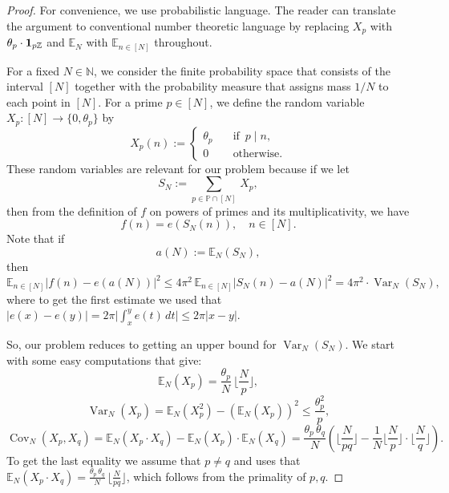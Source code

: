 \documentclass[10pt,a4paper]{amsart}
\newcommand{\Cov}{\operatorname{Cov}}
\newcommand{\E}{{\mathbb E}}
\newcommand{\N}{{\mathbb N}}
\newcommand{\Var}{\operatorname{Var}}
\newcommand{\Z}{{\mathbb Z}}
\renewcommand{\P}{{\mathbb P}}
\begin{document}
\begin{proof}
For convenience, we use probabilistic language. The reader can translate the argument to conventional number theoretic language by replacing $X_p$ with $\theta_p\cdot {\bf 1}_{p\Z}$
and $\E_N$ with $\E_{n\in[N]}$ throughout.


	For a fixed $N\in \N$, we  consider the finite probability space that consists of the  interval $[N]$ together with the probability measure that  assigns mass $1/N$ to each point in $[N]$. For a prime $p\in [N]$, we define the random variable
	$ X_p\colon [N]\to \{0,\theta_p\}$ by
	$$
	X_p(n):=
	\begin{cases} \theta_p \quad & \text {if } \, p\mid n, \\
		0 & \text{otherwise}.
	\end{cases}
	$$
	These random variables are relevant for our problem because if  we let
	$$
	S_N:=\sum_{p\in \P\cap [N]}\, X_p,
	$$
	then from the definition of $f$ on powers of primes and its multiplicativity, we have
	$$
	f(n)=e(S_N(n)), \quad n\in [N].
	$$
	Note that if
	$$
	a(N):=\E_N(S_N),
	$$
	then
	\begin{equation}\label{E:Var1}
		\E_{n\in [N]}|f(n)-e(a(N))|^2\leq 4\pi^2\,  \E_{n\in [N]}|S_N(n)-a(N)|^2=4 \pi^2\cdot \Var_N(S_N),
	\end{equation}
	where to get the first estimate we used that $|e(x)-e(y)|=2\pi \big|\int_x^y e(t)\, dt\big|\leq 2\pi|x-y|$.
	
	So, our problem reduces to getting an upper  bound  for   $ \Var_N(S_N)$.
	We start with some   easy computations that give:
\begin{equation}\label{srednia}
	\E_N(X_p)= \frac{\theta_p}{N}\, \Big\lfloor\frac{N}{p}\Big\rfloor,
\end{equation}
	$$
	\Var_N(X_p)= \E_N(X_p^2)-(\E_N(X_p))^2\leq \frac{\theta_p^2}{p},
	$$
	$$
	\Cov_N(X_p,X_q)=\E_N(X_p\cdot X_q)-\E_N(X_p)\cdot \E_N(X_q) = \frac{\theta_p\, \theta_q}{N}\left(\Big\lfloor\frac{N}{pq}\Big\rfloor - \frac{1}{N}\Big\lfloor\frac{N}{p}\Big\rfloor \cdot \Big\lfloor\frac{N}{q}\Big\rfloor\right).
	$$
	To get the last equality we assume that $p\neq q$ and uses  that $\E_N(X_p\cdot X_q)=\frac{\theta_p\, \theta_q}{N}\, \Big\lfloor\frac{N}{pq}\Big\rfloor$, which follows from
	the primality of $p,q$.
	

\end{proof}
\end{document}
